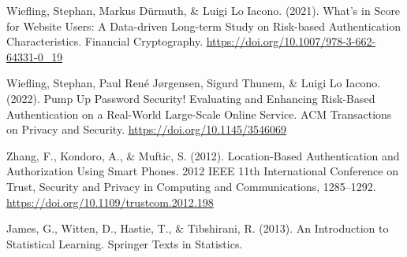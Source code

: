 \begin{thebibliography}{99}
    Wiefling, Stephan, Markus Dürmuth, \& Luigi Lo Iacono. (2021). What’s in Score for Website Users: A Data-driven Long-term Study on Risk-based Authentication Characteristics. Financial Cryptography. \url{https://doi.org/10.1007/978-3-662-64331-0_19}
    
    Wiefling, Stephan, Paul René Jørgensen, Sigurd Thunem, \& Luigi Lo Iacono. (2022). Pump Up Password Security! Evaluating and Enhancing Risk-Based Authentication on a Real-World Large-Scale Online Service. ACM Transactions on Privacy and Security. \url{https://doi.org/10.1145/3546069}
    
    Zhang, F., Kondoro, A., \& Muftic, S. (2012). Location-Based Authentication and Authorization Using Smart Phones. 2012 IEEE 11th International Conference on Trust, Security and Privacy in Computing and Communications, 1285–1292. \url{https://doi.org/10.1109/trustcom.2012.198}

    James, G., Witten, D., Hastie, T., \& Tibshirani, R. (2013). An Introduction to Statistical Learning. Springer Texts in Statistics.
\end{thebibliography}
